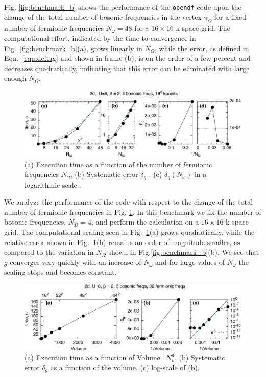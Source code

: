 \documentclass[3p,times,procedia]{elsarticle}
\begin{document}
Fig. \ref{fig:benchmark_b} shows the performance of the \texttt{opendf} code upon the change of the total number of bosonic frequencies in the vertex $\gamma_{\Omega}$ for a fixed number of fermionic frequencies $N_{\omega}=48$ for a $16 \times 16$ k-space grid. The computational effort, indicated by the time to convergence in Fig.~\ref{fig:benchmark_b}(a), grows linearly in $N_{\Omega}$, while the error, as defined in Eqn.~\ref{eqn:deltag} and shown in frame (b), is on the order of a few percent and decreases quadratically, indicating that this error can be eliminated with large enough $N_{\Omega}$.

\begin{figure}[ht]
\includegraphics[width=1.0\columnwidth]{time_ffreqs.pdf}
\caption{(a) Execution time as a function of the number of fermionic frequencies $N_{\omega}$; (b) Systematic error $\delta_g$ . (c) $\delta_g(N_{\omega})$ in a logarithmic scale..}
\label{fig:benchmark_f}
\end{figure}

We analyze the performance of the code with respect to the change of the total number of fermionic frequencies in Fig. \ref{fig:benchmark_f}.  In this benchmark we fix the number of bosonic frequencies, $N_{\Omega}=4$, and perform the calculation on a $16\times16$ k-space grid. The computational scaling seen in Fig.~\ref{fig:benchmark_f}(a)  grows quadratically, while the relative error shown in Fig.~\ref{fig:benchmark_f}(b) remains an order of magnitude smaller, as compared to the variation in $N_{\Omega}$ shown in Fig.\ref{fig:benchmark_b}(b). We see that $g$ converges very quickly with an increase of $N_{\omega}$ and for large values of $N_{\omega}$ the scaling stops and becomes constant.

\begin{figure}[ht]
\includegraphics[width=1.0\columnwidth]{time_kpts.pdf}
\caption{(a) Execution time as a function of Volume=$N_k^d$. (b) Systematic error $\delta_g$ as a function of the volume. (c) log-scale of (b).}
\label{fig:benchmark_kpts}
\end{figure}
\end{document}
